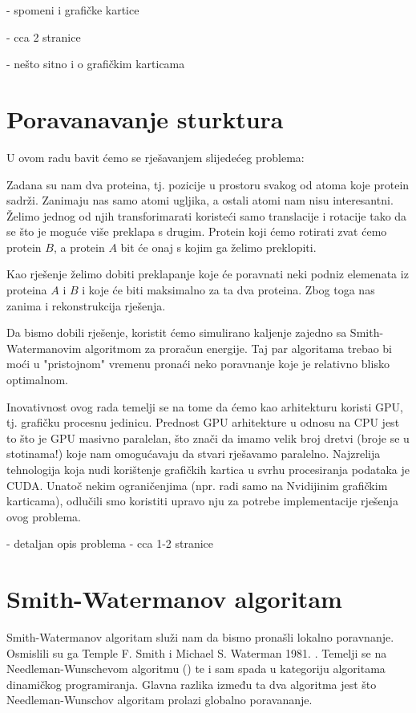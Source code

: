 \documentclass[times, utf8, zavrsni]{fer}
\begin{document}
- spomeni i grafičke kartice

- cca 2 stranice

- nešto sitno i o grafičkim karticama

\chapter{Poravanavanje sturktura}
U ovom radu bavit ćemo se rješavanjem slijedećeg problema: 

Zadana su nam dva proteina, tj. pozicije u prostoru svakog od atoma
koje protein sadrži. Zanimaju nas samo atomi ugljika, a ostali atomi
nam nisu interesantni. Želimo jednog od njih transforimarati 
koristeći samo translacije i rotacije tako da se što je moguće više
preklapa s drugim. Protein koji ćemo rotirati zvat ćemo protein $B$,
a protein $A$ bit će onaj s kojim ga želimo preklopiti. 

Kao rješenje želimo dobiti preklapanje koje će poravnati
neki podniz elemenata iz proteina $A$ i $B$ i koje će biti maksimalno
za ta dva proteina. Zbog toga nas zanima i rekonstrukcija rješenja. 

Da bismo dobili rješenje, koristit ćemo simulirano kaljenje 
zajedno sa Smith-Watermanovim algoritmom za proračun energije. 
Taj par algoritama trebao bi moći u "pristojnom" vremenu pronaći
neko poravnanje koje je relativno blisko optimalnom. 

Inovativnost ovog rada temelji se na tome da ćemo kao arhitekturu
koristi GPU, tj. grafičku procesnu jedinicu. Prednost GPU arhitekture
u odnosu na CPU jest to što je GPU masivno paralelan, što znači
da imamo velik broj dretvi (broje se u stotinama!) koje nam omogućavaju
da stvari rješavamo paralelno. Najzrelija tehnologija koja nudi
korištenje grafičkih kartica u svrhu procesiranja podataka je CUDA.
Unatoč nekim ograničenjima (npr. radi samo na Nvidijinim grafičkim
karticama), odlučili smo koristiti upravo nju za potrebe implementacije
rješenja ovog problema. 

- detaljan opis problema
- cca 1-2 stranice

\chapter{Smith-Watermanov algoritam}
Smith-Watermanov algoritam služi nam da bismo pronašli lokalno poravnanje. 
Osmislili su ga Temple F. Smith i Michael S. Waterman 1981. \cite{smithwaterman1981}.
Temelji se na Needleman-Wunschevom algoritmu (\cite{needlemanwunsch1970})
te i sam spada u kategoriju algoritama dinamičkog programiranja. Glavna razlika
između ta dva algoritma jest što Needleman-Wunschov algoritam prolazi globalno
poravananje.
\end{document}
